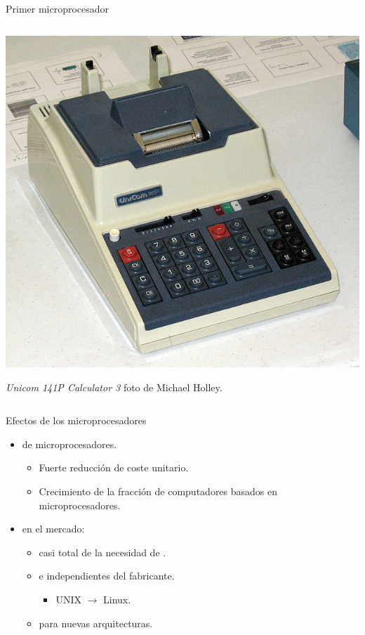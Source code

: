 \begin{frame}[t]{Primer microprocesador}
\begin{columns}[T]
\begin{column}{.3\textwidth}
\begin{tiny}
    \end{tiny}
    \vspace{1em}
    \includegraphics[width=.5\textwidth]{images/i4004-calculator.jpg}\\
    \begin{tiny}
      \emph{Unicom 141P Calculator 3} foto de Michael Holley.\\ 
    \end{tiny}
  \end{column}
\end{columns}
\end{frame}

\begin{frame}[t]{Efectos de los microprocesadores}
\begin{itemize}
  \item {} de microprocesadores.
    \begin{itemize}
      \item Fuerte reducción de coste unitario.
      \item Crecimiento de la fracción de computadores basados en microprocesadores.
    \end{itemize}

  \item {} en el mercado:
    \begin{itemize}
      \item {} casi total de la necesidad de 
            .
      \item {}  e independientes 
            del fabricante.
        \begin{itemize}
          \item UNIX $\rightarrow$ Linux.
        \end{itemize}
      \item {} para nuevas arquitecturas.
    \end{itemize}
\end{itemize}
\end{frame}

